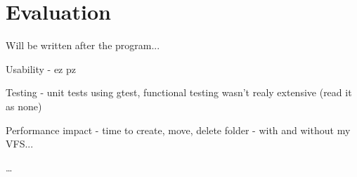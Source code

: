 \chapter{Evaluation}

Will be written after the program...

Usability - ez pz

Testing - unit tests using gtest, functional testing wasn't realy extensive (read it as none)

Performance impact - time to create, move, delete folder - with and without my VFS...

\ldots